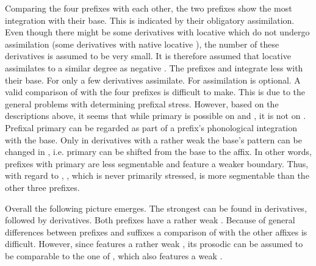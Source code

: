 Comparing the four prefixes with each other, the two prefixes show the most integration with their base. This is indicated by their obligatory assimilation. Even though there might be some derivatives with locative  which do not undergo assimilation (some derivatives with native locative ), the number of these derivatives is assumed to be very small. It is therefore assumed that locative  assimilates to a similar degree as negative . The prefixes  and  integrate less with their base. For  only a few derivatives assimilate. For  assimilation is optional. 
A valid comparison of  with the four prefixes is difficult to make. This is due to the general problems with determining prefixal stress.  However, based on the descriptions above, it seems that while primary  is possible on  and , it is not on . Prefixal primary  can be regarded as part of a prefix's phonological integration with the base. Only in derivatives with a rather weak  the base's  pattern can be changed in , i.e. primary  can be shifted from the base to the affix. In other words, prefixes with primary  are less segmentable and feature a weaker boundary. Thus, with regard to , , which is never primarily stressed, is more segmentable than the other three prefixes.

Overall the following picture emerges. The strongest  can be found in derivatives, followed by derivatives. Both prefixes have a rather weak . Because of general differences between prefixes and suffixes a comparison of  with the other affixes is difficult. However, since  features a rather weak , its prosodic  can be assumed to be comparable to the one of , which also features a weak .



